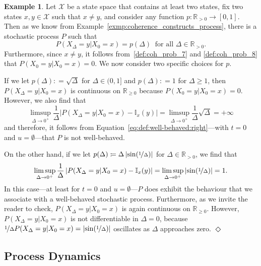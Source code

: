 \documentclass[10pt,a4paper]{paper}
\theoremstyle{definition}
\newtheorem{exmp}{Example}
\newcommand{\reals}{\mathbb{R}}
\newcommand{\realspos}{\reals_{>0}}
\newcommand{\states}{\mathcal{X}}
\newcommand{\ind}[1]{\mathbb{I}_{#1}}
\newcommand{\abs}[1]{\left\vert #1 \right\vert}
\newcommand{\coloneqq}{:\!=}
\newcommand{\exampleend}{\hfill$\Diamond$}
\begin{document}
\begin{exmp}\label{exmp:well-behaved}
Let $\states$ be a state space that contains at least two states, fix two states $x,y\in\states$ such that $x\neq y$, and consider any function $p:\reals_{>0}\to[0,1]$. Then as we know from Example~\ref{exmp:coherence_constructs_process}, there is a stochastic process $P$ such that
\begin{equation*}
P(X_\Delta=y\vert X_0=x)=p(\Delta)
~\text{ for all $\Delta\in\realspos$.}
\end{equation*}
Furthermore, since $x\neq y$, it follows from~\ref{def:coh_prob_7} and \ref{def:coh_prob_8} that $P(X_0=y\vert X_0=x)=0$. We now consider two specific choices for $p$.

If we let $p(\Delta)\coloneqq\sqrt\Delta$ for $\Delta\in(0,1]$ and $p(\Delta)\coloneqq 1$ for $\Delta\geq1$, then $P(X_\Delta=y\vert X_0=x)$ is continuous on $\reals_{\geq0}$ because $P(X_0=y\vert X_0=x)=0$. However, we also find that
\begin{equation*}
\limsup_{\Delta\to0^+}\frac{1}{\Delta}\abs{P(X_{\Delta}=y\vert X_{0}=x) - \ind{x}(y)}
=
\limsup_{\Delta\to0^+}\frac{1}{\Delta}\sqrt\Delta
=+\infty
\end{equation*}
and therefore, it follows from Equation~\eqref{eq:def:well-behaved:right}---with $t=0$ and $u=\emptyset$---that $P$ is not well-behaved.

On the other hand, if we let $p(\Delta)\coloneqq \Delta\abs{\sin(\nicefrac{1}{\Delta})}$ for $\Delta\in\realspos$, we find that
\begin{equation*}
\limsup_{\Delta\to0^+}\frac{1}{\Delta}\abs{P(X_{\Delta}=y\vert X_{0}=x) - \ind{x}(y)}
=
\limsup_{\Delta\to0^+}\abs{\sin(\nicefrac{1}{\Delta})}
=1.
\end{equation*}
In this case---at least for $t=0$ and $u=\emptyset$---$P$ does exhibit the behaviour that we associate with a well-behaved stochastic process. Furthermore, as we invite the reader to check, $P(X_\Delta=y\vert X_0=x)$ is again continuous on $\reals_{\geq0}$. However, $P(X_\Delta=y\vert X_0=x)$ is not differentiable in $\Delta=0$, because $\nicefrac{1}{\Delta}P(X_\Delta=y\vert X_0=x)=\abs{\sin(\nicefrac{1}{\Delta})}$ oscillates as $\Delta$ approaches zero.
\exampleend
\end{exmp}

\subsection{Process Dynamics}\label{sec:dynamics}
\end{document}

